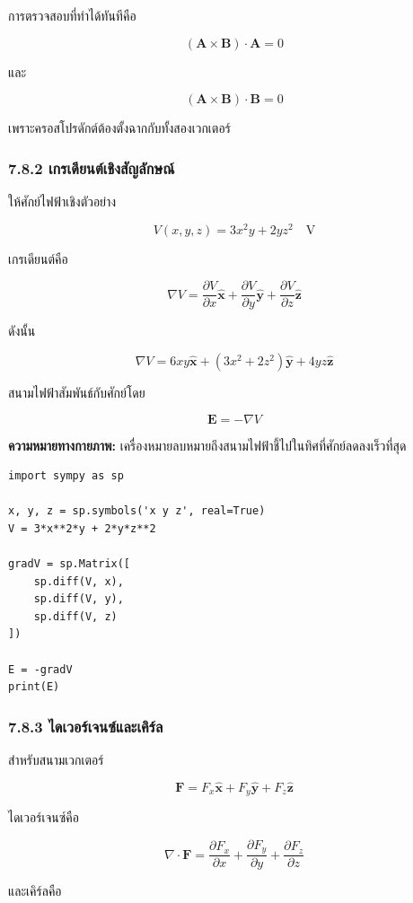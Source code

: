 การตรวจสอบที่ทำได้ทันทีคือ

\[
(\mathbf{A}\times\mathbf{B})\cdot\mathbf{A}=0
\]

และ

\[
(\mathbf{A}\times\mathbf{B})\cdot\mathbf{B}=0
\]

เพราะครอสโปรดักต์ต้องตั้งฉากกับทั้งสองเวกเตอร์

\subsubsection{7.8.2 เกรเดียนต์เชิงสัญลักษณ์}

ให้ศักย์ไฟฟ้าเชิงตัวอย่าง

\[
V(x,y,z)=3x^2y+2yz^2\quad \text{V}
\]

เกรเดียนต์คือ

\[
\nabla V=
\frac{\partial V}{\partial x}\hat{\mathbf{x}}+
\frac{\partial V}{\partial y}\hat{\mathbf{y}}+
\frac{\partial V}{\partial z}\hat{\mathbf{z}}
\]

ดังนั้น

\[
\nabla V=
6xy\hat{\mathbf{x}}+
(3x^2+2z^2)\hat{\mathbf{y}}+
4yz\hat{\mathbf{z}}
\]

สนามไฟฟ้าสัมพันธ์กับศักย์โดย

\[
\mathbf{E}=-\nabla V
\]

\textbf{ความหมายทางกายภาพ:} เครื่องหมายลบหมายถึงสนามไฟฟ้าชี้ไปในทิศที่ศักย์ลดลงเร็วที่สุด

\begin{verbatim}
import sympy as sp

x, y, z = sp.symbols('x y z', real=True)
V = 3*x**2*y + 2*y*z**2

gradV = sp.Matrix([
    sp.diff(V, x),
    sp.diff(V, y),
    sp.diff(V, z)
])

E = -gradV
print(E)
\end{verbatim}

\subsubsection{7.8.3 ไดเวอร์เจนซ์และเคิร์ล}

สำหรับสนามเวกเตอร์

\[
\mathbf{F}=F_x\hat{\mathbf{x}}+F_y\hat{\mathbf{y}}+F_z\hat{\mathbf{z}}
\]

ไดเวอร์เจนซ์คือ

\[
\nabla\cdot\mathbf{F}
=\frac{\partial F_x}{\partial x}
+\frac{\partial F_y}{\partial y}
+\frac{\partial F_z}{\partial z}
\]

และเคิร์ลคือ

